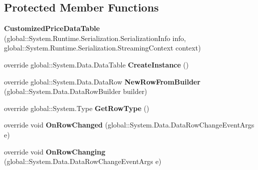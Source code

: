 \subsection*{Protected Member Functions}
\begin{DoxyCompactItemize}
\item 
{\bfseries Customized\+Price\+Data\+Table} (global\+::\+System.\+Runtime.\+Serialization.\+Serialization\+Info info, global\+::\+System.\+Runtime.\+Serialization.\+Streaming\+Context context)\hypertarget{class_products_1_1_data_1_1ds_sage_1_1_customized_price_data_table_a7e40a393fd21f9ce443b29342aa46bc2}{}\label{class_products_1_1_data_1_1ds_sage_1_1_customized_price_data_table_a7e40a393fd21f9ce443b29342aa46bc2}

\item 
override global\+::\+System.\+Data.\+Data\+Table {\bfseries Create\+Instance} ()\hypertarget{class_products_1_1_data_1_1ds_sage_1_1_customized_price_data_table_ad6cd8f3bf1a33f96c1ea892a92fef3f4}{}\label{class_products_1_1_data_1_1ds_sage_1_1_customized_price_data_table_ad6cd8f3bf1a33f96c1ea892a92fef3f4}

\item 
override global\+::\+System.\+Data.\+Data\+Row {\bfseries New\+Row\+From\+Builder} (global\+::\+System.\+Data.\+Data\+Row\+Builder builder)\hypertarget{class_products_1_1_data_1_1ds_sage_1_1_customized_price_data_table_a0ba23377909e1b3595d79b0b86210a6c}{}\label{class_products_1_1_data_1_1ds_sage_1_1_customized_price_data_table_a0ba23377909e1b3595d79b0b86210a6c}

\item 
override global\+::\+System.\+Type {\bfseries Get\+Row\+Type} ()\hypertarget{class_products_1_1_data_1_1ds_sage_1_1_customized_price_data_table_ad60e9f669c3b7e0c6452eb4f3c3e5219}{}\label{class_products_1_1_data_1_1ds_sage_1_1_customized_price_data_table_ad60e9f669c3b7e0c6452eb4f3c3e5219}

\item 
override void {\bfseries On\+Row\+Changed} (global\+::\+System.\+Data.\+Data\+Row\+Change\+Event\+Args e)\hypertarget{class_products_1_1_data_1_1ds_sage_1_1_customized_price_data_table_aac8189b5f548665f1a774f4a9833b594}{}\label{class_products_1_1_data_1_1ds_sage_1_1_customized_price_data_table_aac8189b5f548665f1a774f4a9833b594}

\item 
override void {\bfseries On\+Row\+Changing} (global\+::\+System.\+Data.\+Data\+Row\+Change\+Event\+Args e)\hypertarget{class_products_1_1_data_1_1ds_sage_1_1_customized_price_data_table_ab030c10f2f144a3c7f37debca2898d38}{}\label{class_products_1_1_data_1_1ds_sage_1_1_customized_price_data_table_ab030c10f2f144a3c7f37debca2898d38}


\end{DoxyCompactItemize}
